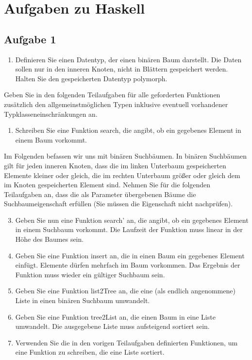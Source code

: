 \documentclass{scrartcl}
\begin{document}
\section*{Aufgaben zu Haskell}
\subsection*{Aufgabe 1}
\begin{enumerate}[1.]
\item Definieren Sie einen Datentyp, der einen binären Baum darstellt. Die Daten sollen nur in den inneren Knoten, nicht in Blättern gespeichert werden. Halten Sie den gespeicherten Datentyp polymorph.
\end{enumerate}
Geben Sie in den folgenden Teilaufgaben für alle geforderten Funktionen zusätzlich den allgemeinstmöglichen Typen inklusive eventuell vorhandener Typklasseneinschränkungen an.
\begin{enumerate}[2.]
\item Schreiben Sie eine Funktion search, die angibt, ob ein gegebenes Element in einem Baum vorkommt.
\end{enumerate}
Im Folgenden befassen wir uns mit binären Suchbäumen. In binären Suchbäumen gilt für jeden inneren Knoten, dass die im linken Unterbaum gespeicherten Elemente kleiner oder gleich, die im rechten Unterbaum größer oder gleich dem im Knoten gespeicherten Element sind. Nehmen Sie für die folgenden Teilaufgaben an, dass die als Parameter übergebenen Bäume die Suchbaumeigenschaft erfüllen (Sie müssen die Eigenschaft nicht nachprüfen).
\begin{enumerate}[1.]
\setcounter{enumi}{2}
\item Geben Sie nun eine Funktion search' an, die angibt, ob ein gegebenes Element in einem Suchbaum vorkommt. Die Laufzeit der Funktion muss linear in der Höhe des Baumes sein.
\item Geben Sie eine Funktion insert an, die in einen Baum ein gegebenes Element einfügt. Elemente dürfen mehrfach im Baum vorkommen. Das Ergebnis der Funktion muss wieder ein gültiger Suchbaum sein.
\item Geben Sie eine Funktion list2Tree an, die eine (als endlich angenommene) Liste in einen binären Suchbaum umwandelt.
\item Geben Sie eine Funktion tree2List an, die einen Baum in eine Liste umwandelt. Die ausgegebene Liste muss aufsteigend sortiert sein.
\item Verwenden Sie die in den vorigen Teilaufgaben definierten Funktionen, um eine Funktion zu schreiben, die eine Liste sortiert.
\end{enumerate}
\end{document}
